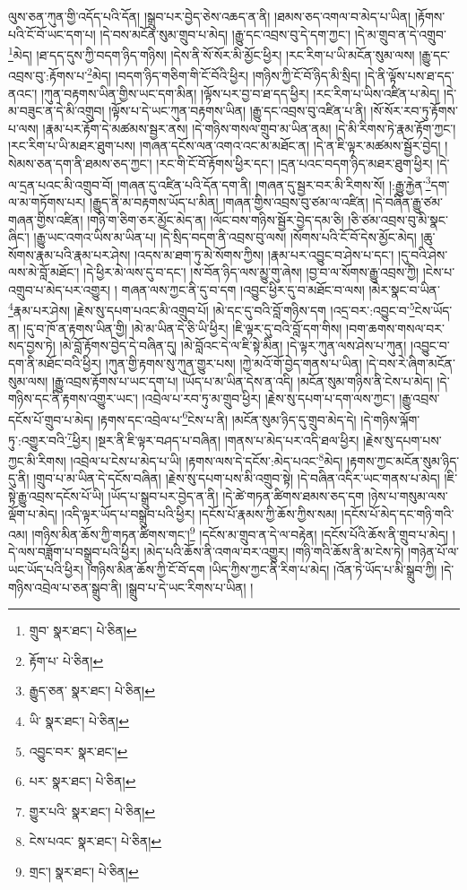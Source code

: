 ལུས་ཅན་ཀུན་གྱི་འདོད་པའི་དོན། །སྒྲུབ་པར་བྱེད་ཅེས་འཆད་ན་ནི། །ཐམས་ཅད་འགལ་བ་མེད་པ་ཡིན། །རྟོགས་པའི་ངོ་བོ་ཡང་དག་པ། །དེ་བས་མངོན་སུམ་གྲུབ་པ་མེད། །རྒྱུ་དང་འབྲས་བུ་དེ་དག་ཀྱང་། །དེ་མ་གྲུབ་ན་དེ་འགྲུབ་\footnote{གྲུབ་  སྣར་ཐང་།  པེ་ཅིན། }མེད། །ཐ་དད་དུས་ཀྱི་བདག་ཉིད་གཉིས། །དེས་ནི་སོ་སོར་མི་མྱོང་ཕྱིར། །རང་རིག་པ་ཡི་མངོན་སུམ་ལས། །རྒྱུ་དང་འབྲས་བུ་:རྟོགས་པ་\footnote{རྟོག་པ་  པེ་ཅིན། }མེད། །བདག་ཉིད་གཅིག་གི་ངོ་བོའི་ཕྱིར། །གཉིས་ཀྱི་ངོ་བོ་ཉིད་མི་སྲིད། །དེ་ནི་ལྟོས་པས་ཐ་དད་ནའང་། །ཀུན་བརྟགས་ཡིན་གྱིས་ཡང་དག་མིན། །ལྟོས་པར་བྱ་བ་ཐ་དད་ཕྱིར། །རང་རིག་པ་ཡིས་འཛིན་པ་མེད། །དེ་མ་བཟུང་ན་དེ་མི་འགྲུབ། །ལྟོས་པ་དེ་ཡང་ཀུན་བརྟགས་ཡིན། །རྒྱུ་དང་འབྲས་བུ་འཛིན་པ་ནི། །སོ་སོར་རབ་ཏུ་རྟོགས་པ་ལས། །རྣམ་པར་རྟོག་དེ་མཚམས་སྦྱར་ནས། །དེ་གཉིས་གསལ་གྲུབ་མ་ཡིན་ནམ། །དེ་མི་རིགས་ཏེ་རྣམ་རྟོག་ཀྱང་། །རང་རིག་པ་ཡི་མཐར་ཐུག་པས། །གཞན་དངོས་ལན་འགའ་འང་མ་མཐོང་ན། །དེ་ན་ཇི་ལྟར་མཚམས་སྦྱོར་བྱེད། །སེམས་ཅན་དག་ནི་ཐམས་ཅད་ཀྱང་། །རང་གི་ངོ་བོ་རྟོགས་ཕྱིར་དང་། །དྲན་པའང་བདག་ཉིད་མཐར་ཐུག་ཕྱིར། །དེ་ལ་དྲན་པའང་མི་འགྲུབ་བོ། །གཞན་དུ་འཛིན་པའི་དོན་དག་ནི། །གཞན་དུ་སྦྱར་བར་མི་རིགས་སོ། །:རྒྱུ་རྐྱེན་\footnote{རྒྱུད་ཅན་  སྣར་ཐང་།  པེ་ཅིན། }དག་ལ་མ་གཏོགས་པར། །རྒྱུད་ནི་མ་བརྟགས་ཡོད་པ་མིན། །གཞན་གྱིས་འབྲས་བུ་ཙམ་ལ་འཛིན། །དེ་བཞིན་རྒྱུ་ཙམ་གཞན་གྱིས་འཛིན། །གཉི་ག་ཅིག་ཅར་མྱོང་མེད་ན། །ལོང་བས་གཉིས་སྦྱོར་བྱེད་དམ་ཅི། །ཅི་ཙམ་འབྲས་བུ་མི་སྣང་ཞིང་། །རྒྱུ་ཡང་འགའ་ཡིས་མ་ཡིན་པ། །དེ་སྲིད་བདག་ནི་འབྲས་བུ་ལས། །སོགས་པའི་ངོ་བོ་དེས་མྱོང་མེད། །ཆུ་སོགས་རྣམ་པའི་རྣམ་པར་ཤེས། །འདས་མ་ཐག་ཏུ་མེ་སོགས་ཀྱིས། །རྣམ་པར་འབྱུང་བ་ཤེས་པ་དང་། །དུ་བའི་ཤེས་ལས་མེ་བློ་མཐོང་། །དེ་ཕྱིར་མེ་ལས་དུ་བ་དང་། །ས་བོན་ཉིད་ལས་མྱུ་གུ་ཞེས། །བྱ་བ་ལ་སོགས་རྒྱུ་འབྲས་ཀྱི། །ངེས་པ་འགྲུབ་པ་མེད་པར་འགྱུར། །
གཞན་ལས་ཀྱང་ནི་དུ་བ་དག །འབྱུང་ཕྱིར་དུ་བ་མཐོང་བ་ལས། །མེར་སྣང་བ་ཡིན་\footnote{ཡི་  སྣར་ཐང་།  པེ་ཅིན། }རྣམ་པར་ཤེས། །རྗེས་སུ་དཔག་པའང་མི་འགྲུབ་པོ། །མེ་དང་དུ་བའི་བློ་གཉིས་དག །འདྲ་བར་:འབྱུང་བ་\footnote{འབྱུང་བར་  སྣར་ཐང་། }ངེས་ཡོད་ན། །དུ་བ་ཁོ་ན་རྟགས་ཡིན་གྱི། །མེ་མ་ཡིན་དེ་ཅི་ཡི་ཕྱིར། །ཇི་ལྟར་དུ་བའི་བློ་དག་གིས། །བག་ཆགས་གསལ་བར་སད་བྱས་ཏེ། །མེ་བློ་རྟོགས་བྱེད་དེ་བཞིན་དུ། །མེ་བློའང་དེ་ལ་ཇི་སྟེ་མིན། །དེ་ལྟར་ཀུན་ལས་ཤེས་པ་ཀུན། །འབྱུང་བ་དག་ནི་མཐོང་བའི་ཕྱིར། །ཀུན་གྱི་རྟགས་སུ་ཀུན་གྱུར་པས། །ཀྱེ་མའོ་གོ་བྱེད་གནས་པ་ཡིན། །དེ་བས་རེ་ཞིག་མངོན་སུམ་ལས། །རྒྱུ་འབྲས་རྟོགས་པ་ཡང་དག་པ། །ཡོད་པ་མ་ཡིན་དེས་ན་འདི། །མངོན་སུམ་གཉིས་ནི་ངེས་པ་མེད། །དེ་གཉིས་དང་ནི་རྟགས་འགྱུར་ཡང་། །འབྲེལ་པ་རབ་ཏུ་མ་གྲུབ་ཕྱིར། །རྗེས་སུ་དཔག་པ་དག་ལས་ཀྱང་། །རྒྱུ་འབྲས་དངོས་པོ་གྲུབ་པ་མེད། །རྟགས་དང་འབྲེལ་པ་\footnote{པར་  སྣར་ཐང་།  པེ་ཅིན། }ངེས་པ་ནི། །མངོན་སུམ་ཉིད་དུ་གྲུབ་མེད་དེ། །དེ་གཉིས་ལྐོག་ཏུ་:འགྱུར་བའི་\footnote{གྱུར་པའི་  སྣར་ཐང་།  པེ་ཅིན། }ཕྱིར། །སྔར་ནི་ཇི་ལྟར་བཤད་པ་བཞིན། །གནས་པ་མེད་པར་འདི་ཐལ་ཕྱིར། །རྗེས་སུ་དཔག་པས་ཀྱང་མི་རིགས། །འབྲེལ་པ་ངེས་པ་མེད་པ་ཡི། །རྟགས་ལས་དེ་དངོས་:མེད་པའང་\footnote{ངེས་པའང་  སྣར་ཐང་།  པེ་ཅིན། }མེད། །རྟགས་ཀྱང་མངོན་སུམ་ཉིད་དུ་ནི། །གྲུབ་པ་མ་ཡིན་དེ་དངོས་བཞིན། །རྗེས་སུ་དཔག་པས་མི་འགྲུབ་སྟེ། །དེ་བཞིན་འདིར་ཡང་གནས་པ་མེད། །ཇི་སྟེ་རྒྱུ་འབྲས་དངོས་པོ་ཡི། །ཡོད་པ་སྒྲུབ་པར་བྱེད་ན་ནི། །དེ་ཚེ་གཏན་ཚིགས་ཐམས་ཅད་དག །ཉེས་པ་གསུམ་ལས་ལྡོག་པ་མེད། །འདི་ལྟར་ཡོད་པ་བསྒྲུབ་པའི་ཕྱིར། །དངོས་པོ་རྣམས་ཀྱི་ཆོས་ཀྱིས་སམ། །དངོས་པོ་མེད་དང་གཉི་གའི་འམ། །གཉིས་མིན་ཆོས་ཀྱི་གཏན་ཚིགས་གང་།\footnote{གྲང་།  སྣར་ཐང་།  པེ་ཅིན། } །དངོས་མ་གྲུབ་ན་དེ་ལ་བརྟེན། །དངོས་པོའི་ཆོས་ནི་གྲུབ་པ་མེད། །དེ་ལས་བཟློག་པ་བསྒྲུབ་པའི་ཕྱིར། །མེད་པའི་ཆོས་ནི་འགལ་བར་འགྱུར། །གཉི་གའི་ཆོས་ནི་མ་ངེས་ཏེ། །གཉེན་པོ་ལ་ཡང་ཡོད་པའི་ཕྱིར། །གཉིས་མིན་ཆོས་ཀྱི་ངོ་བོ་དག །ཡིད་ཀྱིས་ཀྱང་ནི་རིག་པ་མེད། །འོན་ཏེ་ཡོད་པ་མི་སྒྲུབ་ཀྱི། །དེ་གཉིས་འབྲེལ་པ་ཅན་སྒྲུབ་ནི། །སྒྲུབ་པ་དེ་ཡང་རིགས་པ་ཡིན། །
